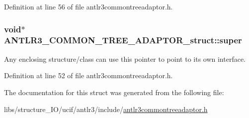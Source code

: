 Definition at line 56 of file antlr3commontreeadaptor.\-h.

\hypertarget{struct_a_n_t_l_r3___c_o_m_m_o_n___t_r_e_e___a_d_a_p_t_o_r__struct_a66f724be506c6bb92d5feb3cfd207635}{
\subsubsection[{super}]{\setlength{\rightskip}{0pt plus 5cm}void$\ast$ A\-N\-T\-L\-R3\-\_\-\-C\-O\-M\-M\-O\-N\-\_\-\-T\-R\-E\-E\-\_\-\-A\-D\-A\-P\-T\-O\-R\-\_\-struct\-::super}}\label{struct_a_n_t_l_r3___c_o_m_m_o_n___t_r_e_e___a_d_a_p_t_o_r__struct_a66f724be506c6bb92d5feb3cfd207635}
Any enclosing structure/class can use this pointer to point to its own interface. 

Definition at line 52 of file antlr3commontreeadaptor.\-h.



The documentation for this struct was generated from the following file\-:\begin{DoxyCompactItemize}
\item 
libs/structure\-\_\-\-I\-O/ucif/antlr3/include/\hyperlink{antlr3commontreeadaptor_8h}{antlr3commontreeadaptor.\-h}\end{DoxyCompactItemize}
